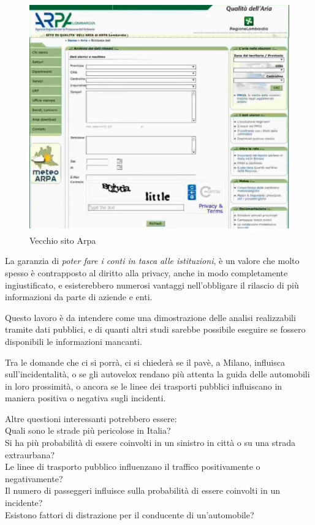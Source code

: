 \documentclass[a4paper,12pt]{report}
\newcommand{\quotestyle}[1]{\textit{#1}}
\begin{document}
\begin{figure}
    \hfill\includegraphics[width=0.7\linewidth]{img/arpa.png}\hspace*{\fill}
    \caption{Vecchio sito Arpa}
\end{figure}

La garanzia di \quotestyle{poter fare i conti in tasca alle istituzioni}, è un 
valore che molto spesso è contrapposto al diritto alla privacy, anche in 
modo completamente ingiustificato, e esisterebbero numerosi vantaggi nell'obbligare 
il rilascio di più informazioni da parte di aziende e enti. 

Questo lavoro è da intendere come una dimostrazione delle analisi realizzabili 
tramite dati pubblici, e di quanti altri studi sarebbe possibile eseguire se fossero 
disponibili le informazioni mancanti.

Tra le domande che ci si porrà, ci si chiederà se il pavè, a Milano, 
influisca sull'incidentalità, o se gli autovelox rendano più attenta 
la guida delle automobili in loro prossimità, o ancora se le linee dei trasporti pubblici 
influiscano in maniera positiva o negativa sugli incidenti.

Altre questioni interessanti potrebbero essere:\\
Quali sono le strade più pericolose in Italia?\\
Si ha più probabilità di essere coinvolti in un sinistro in città o 
su una strada extraurbana?\\
Le linee di trasporto pubblico influenzano il traffico positivamente o negativamente?\\
Il numero di passeggeri influisce sulla probabilità di essere coinvolti in un 
incidente?\\
Esistono fattori di distrazione per il conducente di un'automobile? 
\end{document}
